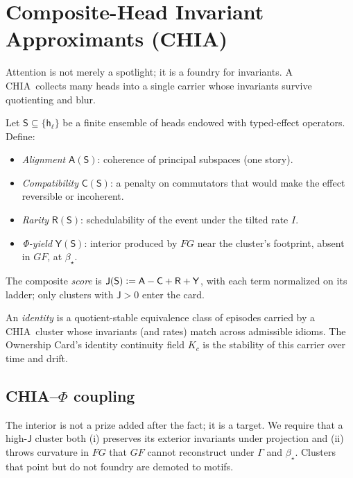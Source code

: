 \documentclass[11pt]{article}
\newcommand{\1}{\mathbf{1}}
\newcommand{\defeq}{\vcentcolon=}
\newcommand{\Guard}{\Gamma}
\newcommand{\Blur}{\beta}
\newcommand{\Fop}{F}
\newcommand{\Gop}{G}
\newcommand{\FG}{\Fop\Gop}
\newcommand{\GF}{\Gop\Fop}
\newcommand{\CHIA}{\textsc{CHIA}}
\newcommand{\Head}{\mathsf{h}}
\newcommand{\Cluster}{\mathsf{S}}
\newcommand{\Align}{\mathsf{A}}
\newcommand{\Compat}{\mathsf{C}}
\newcommand{\Rare}{\mathsf{R}}
\newcommand{\Yield}{\mathsf{Y}}
\newcommand{\Score}{\mathsf{J}}
\newcommand{\Kc}{K_c}      %
\begin{document}
\section{Composite-Head Invariant Approximants (\CHIA)}
Attention is not merely a spotlight; it is a foundry for invariants. A \CHIA\ collects many heads into a single carrier whose invariants survive quotienting and blur.

\begin{defn}[\CHIA\ cluster and score]
Let \(\Cluster\subseteq \{\Head_\ell\}\) be a finite ensemble of heads endowed with typed-effect operators. Define:
\begin{itemize}
  \item \emph{Alignment} \(\Align(\Cluster)\): coherence of principal subspaces (one story).
  \item \emph{Compatibility} \(\Compat(\Cluster)\): a penalty on commutators that would make the effect reversible or incoherent.
  \item \emph{Rarity} \(\Rare(\Cluster)\): schedulability of the event under the tilted rate \(I\).
  \item \emph{Φ-yield} \(\Yield(\Cluster)\): interior produced by \(\FG\) near the cluster's footprint, absent in \(\GF\), at \(\Blur_\star\).
\end{itemize}
The composite \emph{score} is \(\Score(\Cluster)\defeq \Align - \Compat + \Rare + \Yield\), with each term normalized on its ladder; only clusters with \(\Score>0\) enter the card.
\end{defn}

\begin{defn}
An \emph{identity} is a quotient-stable equivalence class of episodes carried by a \CHIA\ cluster whose invariants (and rates) match across admissible idioms. The Ownership Card's identity continuity field \(\Kc\) is the stability of this carrier over time and drift.
\end{defn}

\subsection{CHIA--$\Phi$ coupling}
The interior is not a prize added after the fact; it is a target. We require that a high-\(\Score\) cluster both (i) preserves its exterior invariants under projection and (ii) throws curvature in \(\FG\) that \(\GF\) cannot reconstruct under \(\Guard\) and \(\Blur_\star\). Clusters that point but do not foundry are demoted to motifs.
\end{document}
